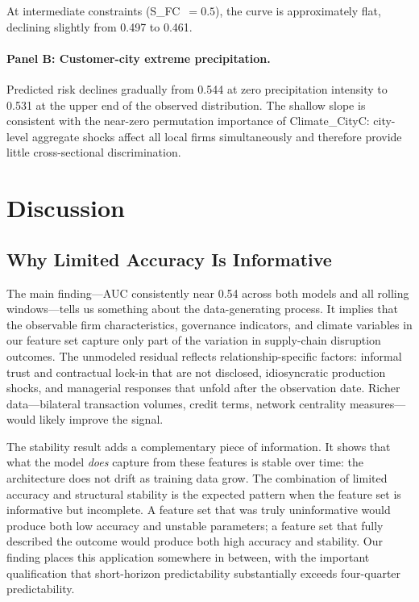 \documentclass[12pt]{article}
\begin{document}
At intermediate constraints (S\_FC~$= 0.5$), the curve is approximately
flat, declining slightly from 0.497 to 0.461.

\paragraph{Panel B: Customer-city extreme precipitation.}
Predicted risk declines gradually from 0.544 at zero precipitation
intensity to 0.531 at the upper end of the observed distribution.  The
shallow slope is consistent with the near-zero permutation importance of
Climate\_CityC: city-level aggregate shocks affect all local firms
simultaneously and therefore provide little cross-sectional discrimination.

\section{Discussion}\label{sec:discussion}

\subsection{Why Limited Accuracy Is Informative}

The main finding---AUC consistently near 0.54 across both models and all
rolling windows---tells us something about the data-generating process.
It implies that the observable firm characteristics, governance indicators,
and climate variables in our feature set capture only part of the variation
in supply-chain disruption outcomes.  The unmodeled residual reflects
relationship-specific factors: informal trust and contractual lock-in that
are not disclosed, idiosyncratic production shocks, and managerial
responses that unfold after the observation date.  Richer data---bilateral
transaction volumes, credit terms, network centrality measures---would
likely improve the signal.

The stability result adds a complementary piece of information.  It shows
that what the model \emph{does} capture from these features is stable over
time: the architecture does not drift as training data grow.  The
combination of limited accuracy and structural stability is the expected
pattern when the feature set is informative but incomplete.  A feature set
that was truly uninformative would produce both low accuracy and unstable
parameters; a feature set that fully described the outcome would produce
both high accuracy and stability.  Our finding places this application
somewhere in between, with the important qualification that short-horizon
predictability substantially exceeds four-quarter predictability.
\end{document}
